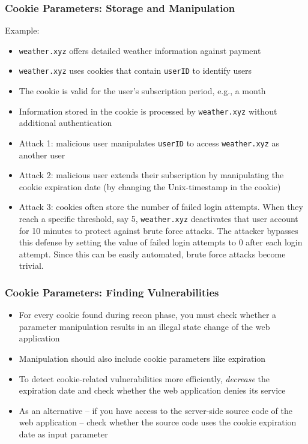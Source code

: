 \begin{frame}
    \frametitle{Cookie Parameters: Storage and Manipulation}
    Example:
    \begin{itemize}
        \item \texttt{weather.xyz} offers detailed weather information against payment
        \item \texttt{weather.xyz} uses cookies that contain \texttt{userID} to identify users
        \item The cookie is valid for the user's subscription period, e.g., a month
        \item Information stored in the cookie is processed by \texttt{weather.xyz} without additional authentication
        \item Attack 1: malicious user manipulates \texttt{userID} to access \texttt{weather.xyz} as another user
        \item Attack 2: malicious user extends their subscription by manipulating the cookie expiration date (by changing the Unix-timestamp in the cookie)
        \item Attack 3: cookies often store the number of failed login attempts. When they reach a specific threshold, say 5, \texttt{weather.xyz} deactivates that user account for 10 minutes to protect against brute force attacks. The attacker bypasses this defense by setting the value of failed login attempts to 0 after each login attempt. Since this can be easily automated, brute force attacks become trivial.
    \end{itemize}
\end{frame}

\begin{frame}
    \frametitle{Cookie Parameters: Finding Vulnerabilities}
    \begin{itemize}
        \item For every cookie found during recon phase, you must check whether a parameter manipulation results in an illegal state change of the web application
        \item Manipulation should also include cookie parameters like expiration
        \item To detect cookie-related vulnerabilities more efficiently, \textit{decrease} the expiration date and check whether the web application denies its service
        \item As an alternative -- if you have access to the server-side source code of the web application -- check whether the source code uses the cookie expiration date as input parameter
    \end{itemize}
\end{frame}

